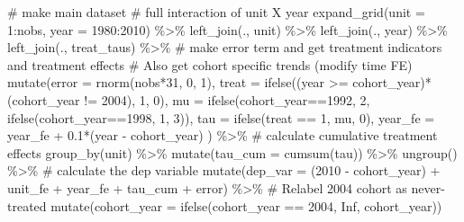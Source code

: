 \documentclass[
  letterpaper,
  DIV=11,
  numbers=noendperiod]{scrartcl}
\newenvironment{Shaded}{\begin{snugshade}}{\end{snugshade}}
\newcommand{\AttributeTok}[1]{\textcolor[rgb]{0.40,0.45,0.13}{#1}}
\newcommand{\CommentTok}[1]{\textcolor[rgb]{0.37,0.37,0.37}{#1}}
\newcommand{\ConstantTok}[1]{\textcolor[rgb]{0.56,0.35,0.01}{#1}}
\newcommand{\DecValTok}[1]{\textcolor[rgb]{0.68,0.00,0.00}{#1}}
\newcommand{\FloatTok}[1]{\textcolor[rgb]{0.68,0.00,0.00}{#1}}
\newcommand{\FunctionTok}[1]{\textcolor[rgb]{0.28,0.35,0.67}{#1}}
\newcommand{\NormalTok}[1]{\textcolor[rgb]{0.00,0.23,0.31}{#1}}
\newcommand{\SpecialCharTok}[1]{\textcolor[rgb]{0.37,0.37,0.37}{#1}}
\begin{document}
\begin{Shaded}
\begin{Highlighting}[]
  \CommentTok{\# make main dataset}
  \CommentTok{\# full interaction of unit X year }
  \FunctionTok{expand\_grid}\NormalTok{(}\AttributeTok{unit =} \DecValTok{1}\SpecialCharTok{:}\NormalTok{nobs, }\AttributeTok{year =} \DecValTok{1980}\SpecialCharTok{:}\DecValTok{2010}\NormalTok{) }\SpecialCharTok{\%\textgreater{}\%} 
    \FunctionTok{left\_join}\NormalTok{(., unit) }\SpecialCharTok{\%\textgreater{}\%} 
    \FunctionTok{left\_join}\NormalTok{(., year) }\SpecialCharTok{\%\textgreater{}\%} 
    \FunctionTok{left\_join}\NormalTok{(., treat\_taus) }\SpecialCharTok{\%\textgreater{}\%} 
    \CommentTok{\# make error term and get treatment indicators and treatment effects}
    \CommentTok{\# Also get cohort specific trends (modify time FE)}
    \FunctionTok{mutate}\NormalTok{(}\AttributeTok{error =} \FunctionTok{rnorm}\NormalTok{(nobs}\SpecialCharTok{*}\DecValTok{31}\NormalTok{, }\DecValTok{0}\NormalTok{, }\DecValTok{1}\NormalTok{),}
           \AttributeTok{treat =} \FunctionTok{ifelse}\NormalTok{((year }\SpecialCharTok{\textgreater{}=}\NormalTok{ cohort\_year)}\SpecialCharTok{*}\NormalTok{ (cohort\_year }\SpecialCharTok{!=} \DecValTok{2004}\NormalTok{), }\DecValTok{1}\NormalTok{, }\DecValTok{0}\NormalTok{),}
           \AttributeTok{mu =} \FunctionTok{ifelse}\NormalTok{(cohort\_year}\SpecialCharTok{==}\DecValTok{1992}\NormalTok{, }\DecValTok{2}\NormalTok{, }\FunctionTok{ifelse}\NormalTok{(cohort\_year}\SpecialCharTok{==}\DecValTok{1998}\NormalTok{, }\DecValTok{1}\NormalTok{, }\DecValTok{3}\NormalTok{)),}
           \AttributeTok{tau =} \FunctionTok{ifelse}\NormalTok{(treat }\SpecialCharTok{==} \DecValTok{1}\NormalTok{, mu, }\DecValTok{0}\NormalTok{),}
           \AttributeTok{year\_fe =}\NormalTok{ year\_fe }\SpecialCharTok{+} \FloatTok{0.1}\SpecialCharTok{*}\NormalTok{(year }\SpecialCharTok{{-}}\NormalTok{ cohort\_year)}
\NormalTok{    ) }\SpecialCharTok{\%\textgreater{}\%} 
    \CommentTok{\# calculate cumulative treatment effects}
    \FunctionTok{group\_by}\NormalTok{(unit) }\SpecialCharTok{\%\textgreater{}\%} 
    \FunctionTok{mutate}\NormalTok{(}\AttributeTok{tau\_cum =} \FunctionTok{cumsum}\NormalTok{(tau)) }\SpecialCharTok{\%\textgreater{}\%} 
    \FunctionTok{ungroup}\NormalTok{() }\SpecialCharTok{\%\textgreater{}\%} 
    \CommentTok{\# calculate the dep variable}
    \FunctionTok{mutate}\NormalTok{(}\AttributeTok{dep\_var =}\NormalTok{ (}\DecValTok{2010} \SpecialCharTok{{-}}\NormalTok{ cohort\_year) }\SpecialCharTok{+}\NormalTok{ unit\_fe }\SpecialCharTok{+}\NormalTok{ year\_fe }\SpecialCharTok{+}\NormalTok{ tau\_cum }\SpecialCharTok{+}\NormalTok{ error) }\SpecialCharTok{\%\textgreater{}\%}
    \CommentTok{\# Relabel 2004 cohort as never{-}treated}
    \FunctionTok{mutate}\NormalTok{(}\AttributeTok{cohort\_year =} \FunctionTok{ifelse}\NormalTok{(cohort\_year }\SpecialCharTok{==} \DecValTok{2004}\NormalTok{, }\ConstantTok{Inf}\NormalTok{, cohort\_year))}
  

\end{Highlighting}
\end{Shaded}
\end{document}
